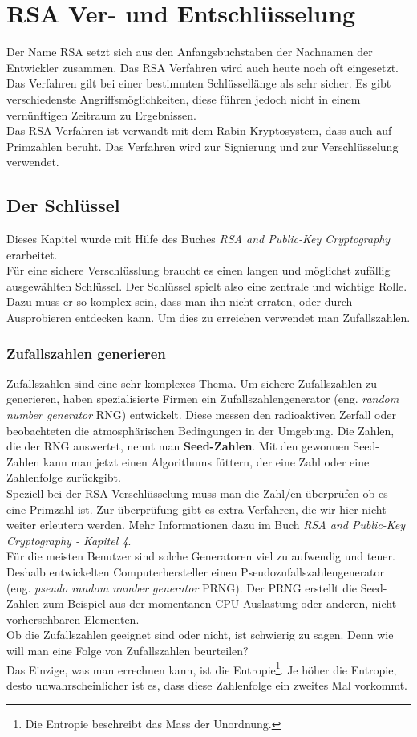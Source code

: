 \newpage
\section{RSA Ver- und Entschlüsselung}
Der Name RSA setzt sich aus den Anfangsbuchstaben der Nachnamen der Entwickler zusammen. Das RSA Verfahren wird auch heute noch oft eingesetzt. Das Verfahren gilt bei einer bestimmten Schlüssellänge als sehr sicher. Es gibt verschiedenste Angriffsmöglichkeiten, diese führen jedoch nicht in einem vernünftigen Zeitraum zu Ergebnissen.\\
Das RSA Verfahren ist verwandt mit dem Rabin-Kryptosystem, dass auch auf Primzahlen beruht. Das Verfahren wird zur Signierung und zur Verschlüsselung verwendet. %

\subsection{Der Schlüssel}
Dieses Kapitel wurde mit Hilfe des Buches \textit{RSA and Public-Key Cryptography} erarbeitet.\\[2ex]
%
Für eine sichere Verschlüsslung braucht es einen langen und möglichst zufällig ausgewählten Schlüssel. Der Schlüssel spielt also eine zentrale und wichtige Rolle. Dazu muss er so komplex sein, dass man ihn nicht erraten, oder durch Ausprobieren entdecken kann. Um dies zu erreichen verwendet man Zufallszahlen.
%
\subsubsection{Zufallszahlen generieren}
Zufallszahlen sind eine sehr komplexes Thema. Um sichere Zufallszahlen zu generieren, haben spezialisierte Firmen ein Zufallszahlengenerator (eng. \textit{random number generator} RNG) entwickelt. Diese messen den radioaktiven Zerfall oder beobachteten die atmosphärischen Bedingungen in der Umgebung. Die Zahlen, die der RNG auswertet, nennt man \textbf{Seed-Zahlen}. Mit den gewonnen Seed-Zahlen kann man jetzt einen Algorithums füttern, der eine Zahl oder eine Zahlenfolge zurückgibt.\\
Speziell bei der RSA-Verschlüsselung muss man die Zahl/en überprüfen ob es eine Primzahl ist. Zur überprüfung gibt es extra Verfahren, die wir hier nicht weiter erleutern werden. Mehr Informationen dazu im Buch \textit{RSA and Public-Key Cryptography - Kapitel 4}.\\
%
Für die meisten Benutzer sind solche Generatoren viel zu aufwendig und teuer. Deshalb entwickelten Computerhersteller einen Pseudozufallszahlengenerator (eng. \textit{pseudo random number generator} PRNG). Der PRNG erstellt die Seed-Zahlen zum Beispiel aus der momentanen CPU Auslastung oder anderen, nicht vorhersehbaren Elementen.\\
Ob die Zufallszahlen geeignet sind oder nicht, ist schwierig zu sagen. Denn wie will man eine Folge von Zufallszahlen beurteilen?\\
Das Einzige, was man errechnen kann, ist die Entropie\footnote{Die Entropie beschreibt das Mass der Unordnung.}. Je höher die Entropie, desto unwahrscheinlicher ist es, dass diese Zahlenfolge ein zweites Mal vorkommt.
